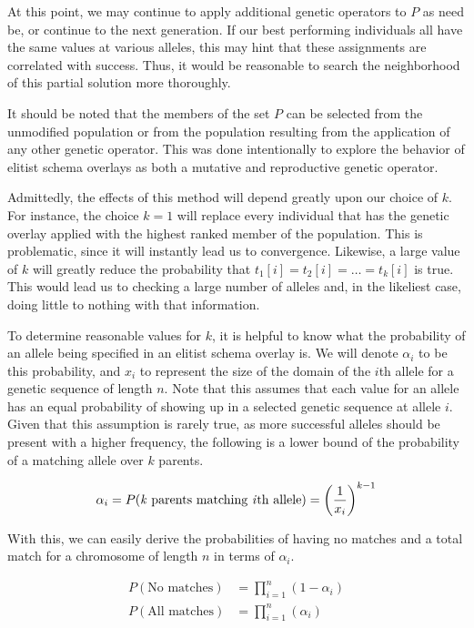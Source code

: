 At this point, we may continue to apply additional genetic operators to $P$ as need be, or continue to the next generation. If our best performing individuals all have the same values at various alleles, this may hint that these assignments are correlated with success. Thus, it would be reasonable to search the neighborhood of this partial solution more thoroughly. 

It should be noted that the members of the set $P$ can be selected from the unmodified population or from the population resulting from the application of any other genetic operator. This was done intentionally to explore the behavior of elitist schema overlays as both a mutative and reproductive genetic operator. 

Admittedly, the effects of this method will depend greatly upon our choice of $k$. For instance, the choice $k = 1$ will replace every individual that has the genetic overlay applied with the highest ranked member of the population. This is problematic, since it will instantly lead us to convergence. Likewise, a large value of $k$ will greatly reduce the probability that $t_1[i] = t_2[i] = \ldots = t_k[i]$ is true. This would lead us to checking a large number of alleles and, in the likeliest case, doing little to nothing with that information.

To determine reasonable values for $k$, it is helpful to know what the probability of an allele being specified in an elitist schema overlay is. We will denote $\alpha_i$ to be this probability, and $x_i$ to represent the size of the domain of the $i$th allele for a genetic sequence of length $n$. Note that this assumes that each value for an allele has an equal probability of showing up in a selected genetic sequence at allele $i$. Given that this assumption is rarely true, as more successful alleles should be present with a higher frequency, the following is a lower bound of the probability of a matching allele over $k$ parents.

\[ \alpha_i = P(\text{\emph{k} parents matching \emph{i}th allele}) = \left(\frac{1}{x_i}\right)^{k-1} \]

With this, we can easily derive the probabilities of having no matches and a total match for a chromosome of length $n$ in terms of $\alpha_i$.

\begin{align*}
P( \text{No matches})&= \prod\limits_{i = 1}^n (1 - \alpha_i) \\
P( \text{All matches})&= \prod\limits_{i = 1}^n (\alpha_i)
\end{align*}

